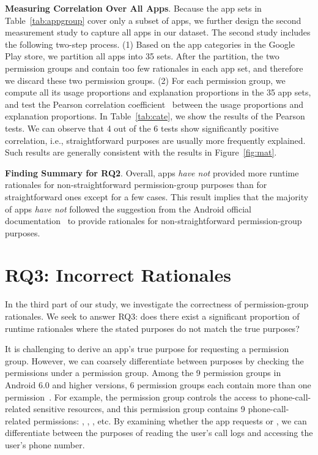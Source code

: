 \textbf{Measuring Correlation Over All Apps}. Because the app sets in Table~\ref{tab:appgroup} cover only a subset of apps, we further design the second measurement study to capture all apps in our dataset. 
The second study includes the following two-step process. 
(1) Based on the app categories in the Google Play store, we partition all apps into 35 sets. After the partition, the two permission groups  and  contain too few rationales in each app set, and therefore we discard these two permission groups. 
(2) For each permission group, we compute all its usage proportions and explanation proportions in the 35 app sets, and test the Pearson correlation coefficient~\cite{pearson} between the usage proportions and explanation proportions. 
In Table~\ref{tab:cate}, we show the results of the Pearson tests. We can observe that 4 out of the 6 tests show significantly positive correlation, i.e., straightforward purposes are usually more frequently explained. 
Such results are generally consistent with the results in Figure~\ref{fig:mat}. 

\textbf{Finding Summary for RQ2}. Overall, apps \emph{have not} provided more runtime rationales for non-straightforward permission-group purposes than for straightforward ones except for a few cases. This result implies that the majority of apps \emph{have not} followed the suggestion from the Android official documentation~\cite{shouldshow} to provide rationales for non-straightforward permission-group purposes.

\section{RQ3: Incorrect Rationales}
\label{sec:rq3}

In the third part of our study, we investigate the correctness of permission-group rationales. 
We seek to answer RQ3: does there exist a significant proportion of runtime rationales where the stated purposes do not match the true purposes?

It is challenging to derive an app's true purpose for requesting a permission group. However, we can coarsely differentiate between purposes by checking the permissions under a permission group. 
Among the 9 permission groups in Android 6.0 and higher versions, 6 permission groups each contain more than one permission~\cite{permgroup}. For example, the  permission group controls the access to phone-call-related sensitive resources, and this permission group contains 9 phone-call-related permissions: , , , etc. By examining whether the app requests  or , we can differentiate between the purposes of reading the user's call logs and accessing the user's phone number. 

